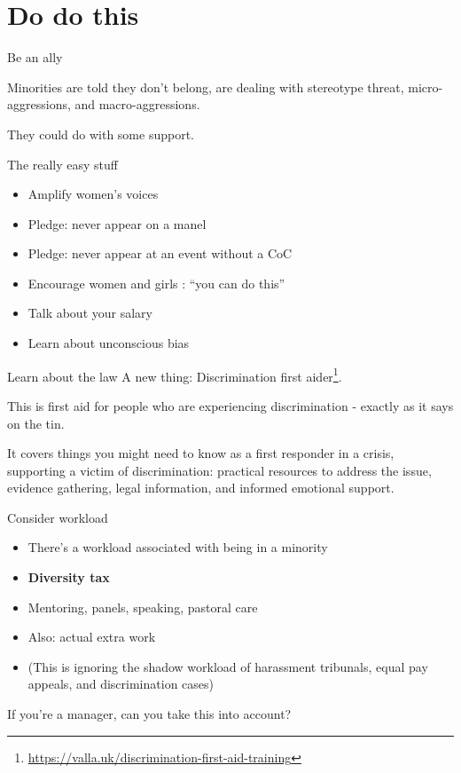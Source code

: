 \documentclass[xcolor=table,aspectratio=169]{beamer}
\begin{document}
\section{Do do this}

\begin{frame}{Be an ally}

	Minorities are told they don't belong, are dealing with stereotype threat, micro-aggressions, and macro-aggressions.

	\vspace{0.5em}

	They could do with some support.

\end{frame}
\begin{frame}{The really easy stuff}
	\begin{itemize}
		\item Amplify women's voices
		\item Pledge: never appear on a manel
		\item Pledge: never appear at an event without a CoC
		\item Encourage women and girls : ``you can do this''
		\item Talk about your salary
		\item Learn about unconscious bias
	\end{itemize}
\end{frame}
\begin{frame}{Learn about the law}
	A new thing: Discrimination first aider\footnote{\url{https://valla.uk/discrimination-first-aid-training}}. 
	
	\vspace{0.5em}

	This is first aid for people who are experiencing discrimination - exactly as it says on the tin. 
	
	\vspace{0.5em}


	It covers things you might need to know as a first responder in a crisis, supporting a victim of discrimination: practical resources to address the issue, evidence gathering, legal information, and informed emotional support.



\end{frame}

\begin{frame}{Consider workload}
	\begin{itemize}
		\item There's a workload associated with being in a minority
		\item \textbf{Diversity tax}
		\item Mentoring, panels, speaking, pastoral care
		\item Also: actual extra work 
		\item (This is ignoring the shadow workload of harassment tribunals, equal pay appeals, and discrimination cases)
	\end{itemize}
	If you're a manager, can you take this into account?  
\end{frame}
\end{document}

